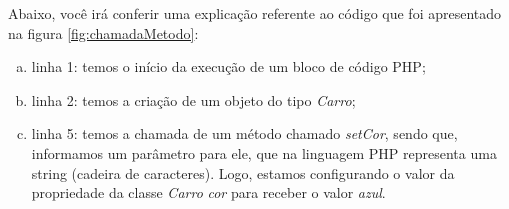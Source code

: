 \FloatBarrier 	%

Abaixo, você irá conferir uma explicação referente ao código que foi
apresentado na figura \ref{fig:chamadaMetodo}:

\begin{enumerate}[a)]
    \item linha 1: temos o início da execução de um bloco de código
    PHP;
    \item linha 2: temos a criação de um objeto do tipo \textit{Carro};
    \item linha 5: temos a chamada de um método chamado
    \textit{setCor}, sendo que, informamos um parâmetro para ele, que na
    linguagem PHP representa uma string (cadeira de caracteres). Logo, estamos
    configurando o valor da propriedade da classe \textit{Carro} \textit{cor}
    para receber o valor \textit{azul}.
\end{enumerate}
